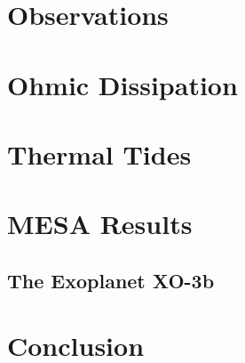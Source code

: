 \documentclass[twocolumn]{emulateapj}
\begin{document}
\section{Observations}
\section{Ohmic Dissipation}
\section{Thermal Tides}
\section{MESA Results}
\subsection{The Exoplanet XO-3b}
\section{Conclusion}

%
\end{document}
